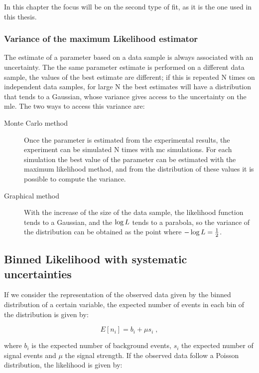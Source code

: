 \noindent In this chapter the focus will be on the second type of fit, as it is the one used in this thesis.

\subsubsection*{Variance of the maximum Likelihood estimator}

The estimate of a parameter based on a data sample is always associated with an uncertainty.
The the same parameter estimate is performed on a different data sample, the values of the best estimate are different;
if this is repeated N times on independent data samples, for large N the best estimates will have a distribution that tends to a Gaussian, 
whose variance gives access to the uncertainty on the \gls{mle}. The two ways to access this variance are:

\begin{description}
\item[Monte Carlo method] Once the parameter is estimated from the experimental results, the experiment can be simulated N times with \gls{mc}  simulations. For each simulation the best value of the parameter can be estimated with the maximum likelihood method, and from the distribution of these values it is possible to compute the variance.

\item[Graphical method] With the increase of the size of the data sample, the likelihood function tends to a Gaussian, and the $\log{L}$ tends to a parabola, so the variance of the distribution can be obtained as the point where $-\log{L} = \frac{1}{2}$.

\end{description}


\subsection{Binned Likelihood with systematic uncertainties}

If we consider the representation of the observed data given by the binned distribution of a certain variable, the expected number of events in each bin of the distribution is given by:

\begin{equation}
\label{eq:stat:exp}
E[n_i] = b_i + \mu s_i  \; ,
\end{equation}

\noindent where $b_i$ is the expected number of background events, $s_i$ the expected number of signal events and $\mu$ the signal strength.
If the observed data follow a Poisson distribution, the likelihood is given by:

